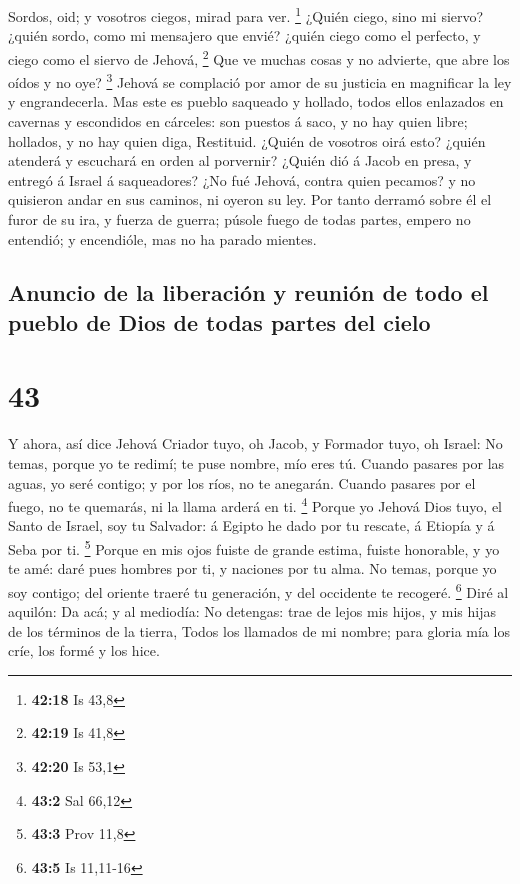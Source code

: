  Sordos, oid; y vosotros ciegos, mirad para ver.
\footnote{\textbf{42:18} Is 43,8}  ¿Quién ciego, sino mi
siervo? ¿quién sordo, como mi mensajero que envié? ¿quién ciego como el
perfecto, y ciego como el siervo de Jehová, \footnote{\textbf{42:19} Is
  41,8}  Que ve muchas cosas y no advierte, que abre los
oídos y no oye? \footnote{\textbf{42:20} Is 53,1}  Jehová
se complació por amor de su justicia en magnificar la ley y
engrandecerla.  Mas este es pueblo saqueado y hollado,
todos ellos enlazados en cavernas y escondidos en cárceles: son puestos
á saco, y no hay quien libre; hollados, y no hay quien diga, Restituid.
 ¿Quién de vosotros oirá esto? ¿quién atenderá y
escuchará en orden al porvernir?  ¿Quién dió á Jacob en
presa, y entregó á Israel á saqueadores? ¿No fué Jehová, contra quien
pecamos? y no quisieron andar en sus caminos, ni oyeron su ley.
 Por tanto derramó sobre él el furor de su ira, y fuerza
de guerra; púsole fuego de todas partes, empero no entendió; y
encendióle, mas no ha parado mientes.

\hypertarget{anuncio-de-la-liberaciuxf3n-y-reuniuxf3n-de-todo-el-pueblo-de-dios-de-todas-partes-del-cielo}{%
\subsection{Anuncio de la liberación y reunión de todo el pueblo de Dios
de todas partes del
cielo}\label{anuncio-de-la-liberaciuxf3n-y-reuniuxf3n-de-todo-el-pueblo-de-dios-de-todas-partes-del-cielo}}

\hypertarget{section-42}{%
\section{43}\label{section-42}}

 Y ahora, así dice Jehová Criador tuyo, oh Jacob, y
Formador tuyo, oh Israel: No temas, porque yo te redimí; te puse nombre,
mío eres tú.  Cuando pasares por las aguas, yo seré
contigo; y por los ríos, no te anegarán. Cuando pasares por el fuego, no
te quemarás, ni la llama arderá en ti. \footnote{\textbf{43:2} Sal 66,12}
 Porque yo Jehová Dios tuyo, el Santo de Israel, soy tu
Salvador: á Egipto he dado por tu rescate, á Etiopía y á Seba por ti.
\footnote{\textbf{43:3} Prov 11,8}  Porque en mis ojos
fuiste de grande estima, fuiste honorable, y yo te amé: daré pues
hombres por ti, y naciones por tu alma.  No temas, porque
yo soy contigo; del oriente traeré tu generación, y del occidente te
recogeré. \footnote{\textbf{43:5} Is 11,11-16}  Diré al
aquilón: Da acá; y al mediodía: No detengas: trae de lejos mis hijos, y
mis hijas de los términos de la tierra,  Todos los
llamados de mi nombre; para gloria mía los críe, los formé y los hice.

